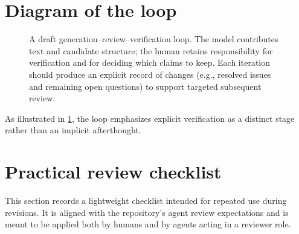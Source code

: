 \documentclass[11pt,a4paper]{article}
\theoremstyle{definition}
\theoremstyle{remark}
\begin{document}
\section{Diagram of the loop}
\label{sec:diagram}

\begin{figure}[ht]
\centering
{}
\caption{A draft generation--review--verification loop. The model contributes text and candidate structure; the human retains responsibility for verification and for deciding which claims to keep. Each iteration should produce an explicit record of changes (e.g., resolved issues and remaining open questions) to support targeted subsequent review.}
\label{fig:loop}
\end{figure}

As illustrated in \cref{fig:loop}, the loop emphasizes explicit verification as a distinct stage rather than an implicit afterthought.

\section{Practical review checklist}
\label{sec:checklist}

This section records a lightweight checklist intended for repeated use during revisions. It is aligned with the repository’s agent review expectations and is meant to be applied both by humans and by agents acting in a reviewer role.
\end{document}

